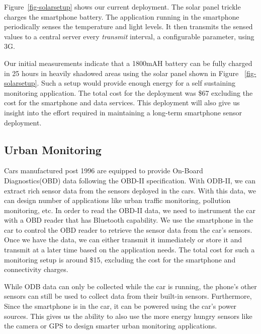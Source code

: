 Figure~\ref{fig-solarsetup} shows our current deployment. The solar panel trickle
charges the smartphone battery. The application running in the smartphone
periodically senses the temperature and light levels. It then transmits the
sensed values to a central server every \textit{transmit} interval, a
configurable parameter, using 3G. 

Our initial measurements indicate that a 1800mAH battery can be fully charged
in 25 hours in heavily shadowed areas using the solar panel shown in Figure
~\ref{fig-solarsetup}. Such a setup would provide
enough energy for a self sustaining monitoring application. The total cost for the
deployment was \$67 excluding the cost for the smartphone and data services.
This deployment will also give us insight into the effort required in
maintaining a long-term smartphone sensor deployment.

\subsection{Urban Monitoring}
Cars manufactured post 1996 are equipped to provide On-Board Diagnostics(OBD)
data following the OBD-II specification. With ODB-II, we can extract rich
sensor data from the sensors deployed in the cars. With this data, we can design number of
applications like urban traffic monitoring, pollution monitoring, etc. In order to 
read the OBD-II data, we need to instrument the car with a OBD reader that has Bluetooth 
capability. We use the smartphone in the car to control
the OBD reader to retrieve the sensor data from the car's sensors. Once we have
the data, we can either transmit it immediately or store it and transmit at a
later time based on the application needs. The total cost for such a monitoring setup
is around \$15, excluding the cost for the smartphone and connectivity charges.

While ODB data can only be collected while the car is running, the phone's other
sensors can still be used to collect data from their built-in sensors.  Furthermore,
Since the smartphone is in the car, it can be powered using the car's power
sources. This gives us the ability to also use the more energy hungry sensors
like the camera or GPS to design smarter urban monitoring applications. 

